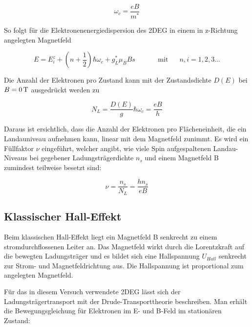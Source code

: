 \begin{equation}
\omega_c=\frac{eB}{m^*}
\label{eq:kreisfrequenz}
\end{equation}

So folgt für die Elektronenenergiedispersion des 2DEG in einem in z-Richtung angelegten Magnetfeld

\begin{equation}
E=E_i^z +(n+\frac{1}{2})\hbar\omega_c +g_L^*\mu_B Bs \text{~~~~~~~~~~mit~~~~~} n,i=1,2,3...
\label{eq:elektr_disp_bfeld}	
\end{equation}

Die Anzahl der Elektronen pro Zustand kann mit der Zustandsdichte $D(E)$ bei $B=\unit[0]{T}$ ausgedrückt werden zu

\begin{equation}
N_L=\frac{D(E)}{g}\hbar\omega_c = \frac{eB}{h}
\label{eq:zustandsd_pro_landauniveau}
\end{equation}

Daraus ist ersichtlich, dass die Anzahl der Elektronen pro Flächeneinheit, die ein Landauniveau aufnehmen kann, linear mit dem Magnetfeld zunimmt. Es wird ein Füllfaktor $\nu$ eingeführt, welcher angibt, wie viele Spin aufgespaltenen Landau-Niveaus bei gegebener Ladungsträgerdichte $n_s$ und einem Magnetfeld B zumindest teilweise besetzt sind:

\begin{equation}
\nu=\frac{n_s}{N_L}=\frac{hn_s}{eB}
\label{eq:einfuehrung_fuellfakt}
\end{equation}


\subsection{Klassischer Hall-Effekt}

Beim klassischen Hall-Effekt liegt ein Magnetfeld B senkrecht zu einem stromdurchflossenen Leiter an. Das Magnetfeld wirkt durch die Lorentzkraft auf die bewegten Ladungsträger und es bildet sich eine Hallspannung $U_{Hall}$ senkrecht zur Strom- und Magnetfeldrichtung aus. Die Hallspannung ist proportional zum angelegten Magnetfeld.


Für das in diesem Versuch verwendete 2DEG lässt sich der Ladungsträgertransport mit der Drude-Transporttheorie beschreiben. 
Man erhält die Bewegungsgleichung für Elektronen im E- und B-Feld im stationären Zustand:

